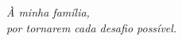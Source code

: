 \vspace*{\fill}
\begin{flushright}
\textit{À minha família,\\
por tornarem cada desafio possível.}
\end{flushright}
